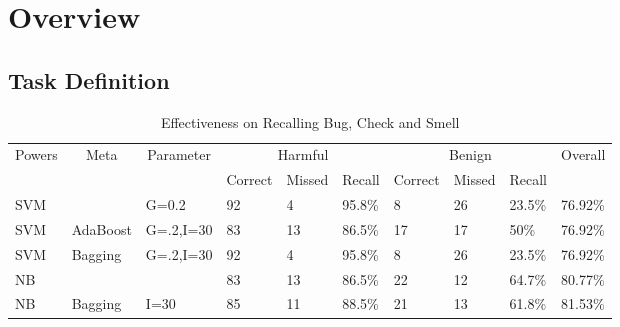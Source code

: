 \documentclass[nocopyrightspace]{sigplanconf}
\begin{document}
\section{Overview}
\subsection{Task Definition}

\begin{table}[htb!]
\centering
\begin{tabularx}{\textwidth}{|X|X|X|X|X|X|X|X|X|X|}
\hline
\multicolumn{1}{|c|}{\multirow{2}{*}{Powers}} & 
\multicolumn{1}{|c|}{\multirow{2}{*}{Meta}} & 
\multicolumn{1}{|c|}{\multirow{2}{*}{Parameter}} & 
\multicolumn{3}{|c|}{Harmful} & 
\multicolumn{3}{|c|}{Benign} & 
\multicolumn{1}{|c|}{\multirow{2}{*}{Overall}} \\
\cline{4-9}

& & & Correct & Missed & Recall & Correct & Missed & Recall & \\
\hline

SVM & & G=0.2 & 92 & 4 & 95.8\% & 8 & 26 & 23.5\% & 76.92\% \\
\hline
SVM & AdaBoost & G=.2,I=30 & 83 & 13 & 86.5\% & 17 & 17 & 50\% & 76.92\% \\
\hline
SVM	& Bagging& G=.2,I=30  & 92 & 4 & 95.8\% & 8 & 26 & 23.5\% & 76.92\% \\
\hline
NB & & & 83 & 13 & 86.5\% & 22 & 12 & 64.7\% & 80.77\% \\
\hline
NB & Bagging & I=30 & 85 & 11 & 88.5\% & 21 & 13 & 61.8\% & 81.53\% \\
\hline
\end{tabularx}
\caption{Effectiveness on Recalling Bug, Check and Smell}
\label{tab:dataset1}
\end{table}
\end{document}
